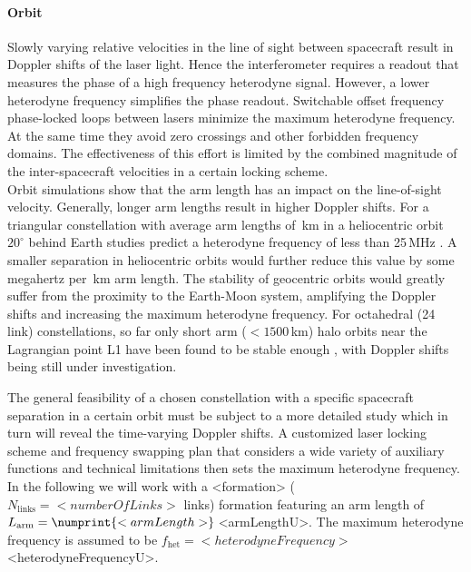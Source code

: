 \documentclass[fleqn,10pt]{<approot>/designer/latexelements/SelfArx} %
\begin{document}
\paragraph{Orbit}
Slowly varying relative velocities in the line of sight between spacecraft result in Doppler shifts of the laser light. Hence the interferometer requires a readout that measures the phase of a high frequency heterodyne signal. However, a lower heterodyne frequency simplifies the phase readout.
Switchable offset frequency phase-locked loops between lasers minimize the maximum heterodyne frequency. At the same time they avoid zero crossings and other forbidden frequency domains. The effectiveness of this effort is limited by the combined magnitude of the inter-spacecraft velocities in a certain locking scheme.\\

Orbit simulations \cite{ojennrich} show that the arm length has an impact on the line-of-sight velocity. Generally, longer arm lengths result in higher Doppler shifts.
For a triangular constellation with average arm lengths of \,km in a heliocentric orbit $20^\circ$ behind Earth studies predict a heterodyne frequency of less than 25\,MHz \cite{SBarkePhD}. A smaller separation in heliocentric orbits would further reduce this value by some megahertz per \,km arm length. The stability of geocentric orbits would greatly suffer from the proximity to the Earth-Moon system, amplifying the Doppler shifts and increasing the maximum heterodyne frequency. For octahedral (24 link) constellations, so far only short arm ($< 1500$\,km) halo orbits near the Lagrangian point L1 have been found to be stable enough \cite{wang2013octahedron}, with Doppler shifts being still under investigation.

The general feasibility of a chosen constellation with a specific spacecraft separation in a certain orbit must be subject to a more detailed study which in turn will reveal the time-varying Doppler shifts. 
A customized laser locking scheme and frequency swapping plan \cite{SBarkePhD} that considers a wide variety of auxiliary functions \cite{heinzel2011auxiliary} and technical limitations then sets the maximum heterodyne frequency. In the following we will work with a  <formation> ($N_\text{links} = <numberOfLinks>$ links) formation  featuring an arm length of $L_\text{arm} = \numprint{<armLength>}$\,<armLengthU>. The maximum heterodyne frequency is assumed to be $f_\text{het} = <heterodyneFrequency>$\,<heterodyneFrequencyU>.\\
\end{document}
